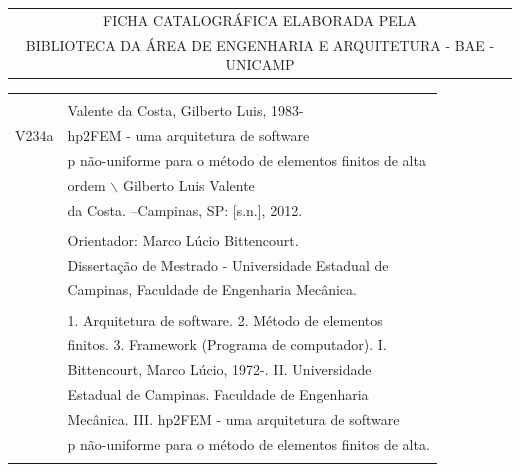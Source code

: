 \begin{center}
\begin{tabular}{c}
  FICHA CATALOGRÁFICA ELABORADA PELA \\
  BIBLIOTECA DA ÁREA DE ENGENHARIA E ARQUITETURA - BAE - UNICAMP \\
\end{tabular}

\vspace{0.8cm}
\begin{tabular}{|cl|} \hline
  \hspace{2cm} & \\
  & Valente da Costa, Gilberto Luis, 1983-				\\  
  V234a & \hspace{0.15in} hp2FEM - uma arquitetura de software		\\
  & p não-uniforme para o método de elementos finitos de alta		\\
  & ordem $\backslash$ Gilberto Luis Valente				\\
  & da Costa. --Campinas, SP: [s.n.], 2012.				\\
  &  \\  
  & \hspace{0.15in} Orientador: Marco Lúcio Bittencourt. 		\\
  & \hspace{0.15in} Dissertação de Mestrado - Universidade Estadual de\\
  & Campinas, Faculdade de Engenharia Mecânica. 			\\
  & \\
  & \hspace{0.15in} 1. Arquitetura de software. 2. Método de elementos\\
  & finitos. 3. Framework (Programa de computador). I.			\\
  & Bittencourt, Marco Lúcio, 1972-. II. Universidade			\\
  & Estadual de Campinas. Faculdade de Engenharia			\\
  & Mecânica. III. hp2FEM - uma arquitetura de software		\\
  & p não-uniforme para o método de elementos finitos de alta.		\\
  & \\ \hline
\end{tabular}
\end{center}

